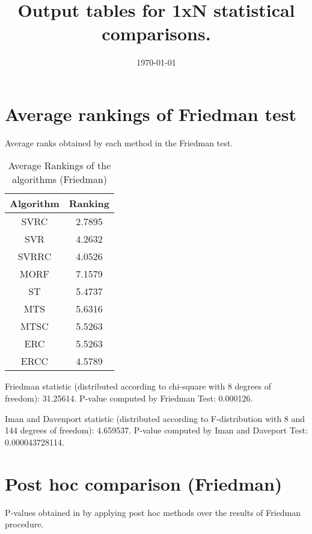 \documentclass[a4paper,10pt]{article}
\title{Output tables for 1xN statistical comparisons.}
\author{}
\date{\today}
\begin{document}
\begin{landscape}
\pagestyle{empty}
\maketitle
\thispagestyle{empty}

\section{Average rankings of Friedman test}


Average ranks obtained by each method in the Friedman test.

\begin{table}[!htp]
\centering
\begin{tabular}{|c|c|}\hline
Algorithm&Ranking\\\hline
SVRC&2.7895\\SVR&4.2632\\SVRRC&4.0526\\MORF&7.1579\\ST&5.4737\\MTS&5.6316\\MTSC&5.5263\\ERC&5.5263\\ERCC&4.5789\\\hline\end{tabular}
\caption{Average Rankings of the algorithms (Friedman)}
\end{table}

Friedman statistic (distributed according to chi-square with 8 degrees of freedom): 31.25614. \newline P-value computed by Friedman Test: 0.000126.\newline

Iman and Davenport statistic (distributed according to F-distribution with 8 and 144 degrees of freedom): 4.659537. \newline P-value computed by Iman and Daveport Test: 0.000043728114.\newline


\newpage

\section{Post hoc comparison (Friedman)}


P-values obtained in by applying post hoc methods over the results of Friedman procedure.


\end{landscape}
\end{document}
